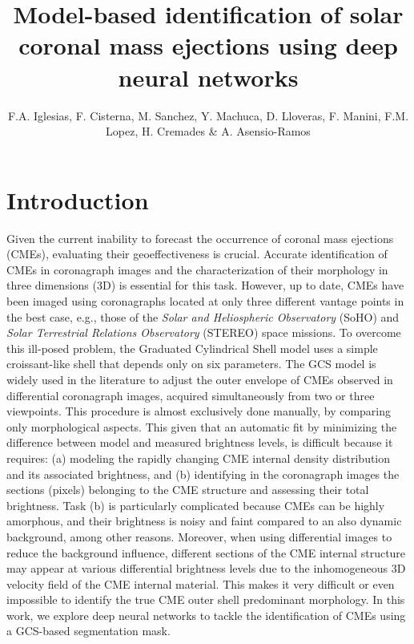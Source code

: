 \documentclass[baaa]{baaa}
\title{Model-based identification of solar coronal mass ejections using deep neural networks}
\author{
F.A. Iglesias\inst{1,2},
F. Cisterna\inst{1},
M. Sanchez\inst{1},
Y. Machuca\inst{1},
D. Lloveras\inst{1,2},
F. Manini\inst{1,2},
F.M. Lopez\inst{1,2},
H. Cremades\inst{1,2}
\&
A. Asensio-Ramos\inst{3}
}
\institute{
Grupo de Estudios en Heliofísica de Mendoza, Universidad de Mendoza, Argentina 
\and
Consejo Nacional de Investigaciones Científicas y Técnicas, Argentina
 \and
Instituto de Astrofísica de Canarias, España 
}
\begin{document}
\maketitle
\section{Introduction}\label{S_intro}
Given the current inability to forecast the occurrence of coronal mass ejections (CMEs), evaluating their geoeffectiveness is crucial. Accurate identification of CMEs in coronagraph images and the characterization of their morphology in three dimensions (3D) is essential for this task. However, up to date, CMEs have been imaged using coronagraphs located at only three different vantage points in the best case, e.g., those of the \textit{Solar and Heliospheric Observatory} (SoHO) and \textit{Solar Terrestrial Relations Observatory} (STEREO) space missions. To overcome this ill-posed problem, the Graduated Cylindrical Shell model \citep{Thernisien-etal2009} uses a simple croissant-like shell that depends only on six parameters. The GCS model is widely used in the literature to adjust the outer envelope of CMEs observed in differential coronagraph images, acquired simultaneously from two or three viewpoints. This procedure is almost exclusively done manually, by comparing only morphological aspects. This given that an automatic fit by minimizing the difference between model and measured brightness levels, is difficult because it requires: (a) modeling the rapidly changing CME internal density distribution and its associated brightness, and (b) identifying in the coronagraph images the sections (pixels) belonging to the CME structure and assessing their total brightness. Task (b) is particularly complicated because CMEs can be highly amorphous, and their brightness is noisy and faint compared to an also dynamic background, among other reasons. Moreover, when using differential images to reduce the background influence, different sections of the CME internal structure may appear at various differential brightness levels due to the inhomogeneous 3D velocity field of the CME internal material. This makes it very difficult or even impossible to identify the true CME outer shell predominant morphology. In this work, we explore deep neural networks to tackle the identification of CMEs using a GCS-based segmentation mask.
\end{document}
